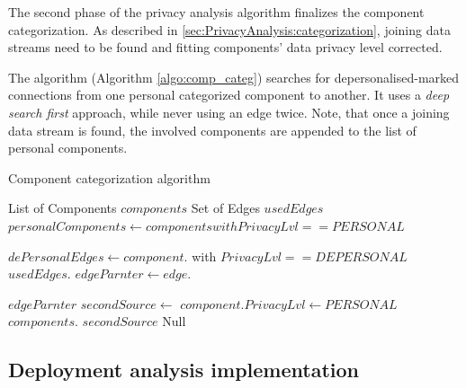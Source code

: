The second phase of the privacy analysis algorithm finalizes the component categorization. As described in \autoref{sec:PrivacyAnalysis:categorization}, joining data streams need to be found and fitting components' data privacy level corrected.

The algorithm (Algorithm \ref{algo:comp_categ}) searches for depersonalised-marked connections from one personal categorized component to another. It uses a \textit{deep search first} approach, while never using an edge twice. Note, that once a joining data stream is found, the involved components are appended to the list of personal components.

\begin{algorithm}[h]
	\caption{Component categorization algorithm}
	\label{algo:comp_categ}
\begin{algorithmic}[1]
	
	\State List of Components $components$
	\State Set of Edges $usedEdges$ 
	\State
	\State
		$personalComponents\gets components with PrivacyLvl == PERSONAL$
		\State
			\State
		\EndFor
	\EndProcedure \State
	
	\State
		$dePersonalEdges\gets component.$ with $PrivacyLvl == DEPERSONAL$
		\State
			 \State 
			\Else \State
				$usedEdges.$ \State
				$edgeParnter\gets edge.$ \State
				
				 \State
					\Return $edgeParnter$
				\Else \State
					$secondSource\gets$ 
					 \State
						$component.PrivacyLvl\gets PERSONAL$ \State
						$components.$ \State
						\Return $secondSource$
					\EndIf
				\EndIf 
			\EndIf
		\EndFor \State
		\Return Null
	\EndFunction
\end{algorithmic}
\end{algorithm}



\subsection{Deployment analysis implementation}

